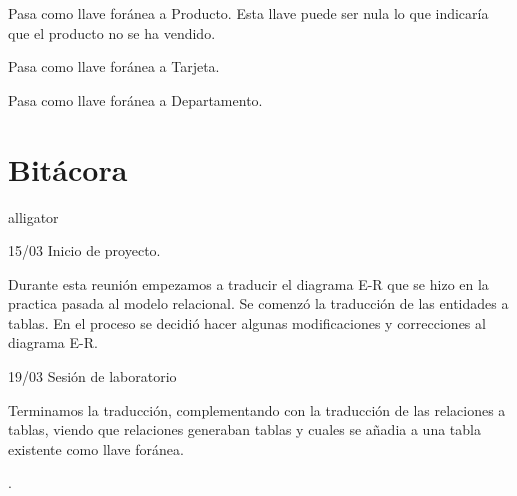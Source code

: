 \documentclass[10pt]{article}
\begin{document}
\begin{description}[leftmargin=9em,style=nextline]
    		\item[Consumir inventario] Pasa como llave foránea a Producto. Esta llave puede ser nula lo que indicaría que el producto no se ha vendido. \\
    		
    		\item[Asociar] Pasa como llave foránea a Tarjeta. \\
    		
    		\item[Poseer] Pasa como llave foránea a Departamento. \\
    		
    	\end{description}
   

	
	

	
	
	
	
	\section{Bitácora}
	
	\begin{labeling}{alligator}
		\item [15/03] Inicio de proyecto.
            
            Durante esta reunión empezamos a traducir el diagrama E-R que se hizo en la practica pasada al modelo relacional. Se comenzó la traducción de las entidades a tablas. En el proceso se decidió hacer algunas modificaciones y correcciones al diagrama E-R.            
		\item [19/03] Sesión de laboratorio
		
		    Terminamos la traducción, complementando con la traducción de las relaciones a tablas, viendo que relaciones generaban tablas y cuales se añadia a una tabla existente como llave foránea.
		
            . 
    
		
       
        
	
		
	\end{labeling}
	
	
	
\end{document}
